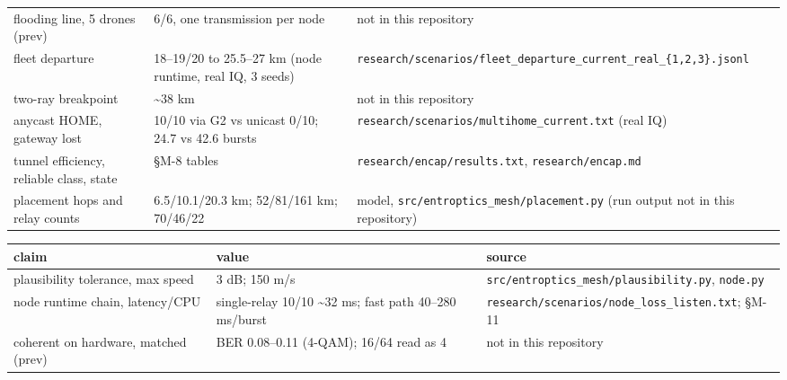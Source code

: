\documentclass[10pt,letterpaper,twocolumn]{article}
\begin{document}
\begin{table}[tp]
\begin{tabular}{L{0.175\textwidth}L{0.545\textwidth}L{0.230\textwidth}}
flooding line, 5 drones (prev) & 6/6, one transmission per node & not in this repository \\
fleet departure & 18--19/20 to 25.5--27 km (node runtime, real IQ, 3 seeds) & \texttt{research/\allowbreak{}scenarios/\allowbreak{}fleet\_\allowbreak{}departure\_\allowbreak{}current\_\allowbreak{}real\_\allowbreak{}\{1,\allowbreak{}2,\allowbreak{}3\}.\allowbreak{}jsonl} \\
two-ray breakpoint & \textasciitilde38 km & not in this repository \\
anycast HOME, gateway lost & 10/10 via G2 vs unicast 0/10; 24.7 vs 42.6 bursts & \texttt{research/\allowbreak{}scenarios/\allowbreak{}multihome\_\allowbreak{}current.\allowbreak{}txt}
(real IQ) \\
tunnel efficiency, reliable class, state & §M-8 tables & \texttt{research/\allowbreak{}encap/\allowbreak{}results.\allowbreak{}txt},
\texttt{research/\allowbreak{}encap.\allowbreak{}md} \\
placement hops and relay counts & 6.5/10.1/20.3 km; 52/81/161 km; 70/46/22 & model,
\texttt{src/\allowbreak{}entroptics\_\allowbreak{}mesh/\allowbreak{}placement.\allowbreak{}py}
(run output not in this repository) \\
\bottomrule
\end{tabular}
\end{table}
\begin{table}[tp]
\centering\footnotesize
\begin{tabular}{L{0.175\textwidth}L{0.545\textwidth}L{0.230\textwidth}}
\toprule
claim & value & source \\
\midrule
plausibility tolerance, max speed & 3 dB; 150 m/s & \texttt{src/\allowbreak{}entroptics\_\allowbreak{}mesh/\allowbreak{}plausibility.\allowbreak{}py},
\texttt{node.\allowbreak{}py} \\
node runtime chain, latency/CPU & single-relay 10/10 \textasciitilde32 ms; fast path 40--280 ms/burst & \texttt{research/\allowbreak{}scenarios/\allowbreak{}node\_\allowbreak{}loss\_\allowbreak{}listen.\allowbreak{}txt};
§M-11 \\
coherent on hardware, matched (prev) & BER 0.08--0.11 (4-QAM); 16/64 read as 4 & not in this repository \\
\bottomrule
\end{tabular}
\end{table}
\end{document}
